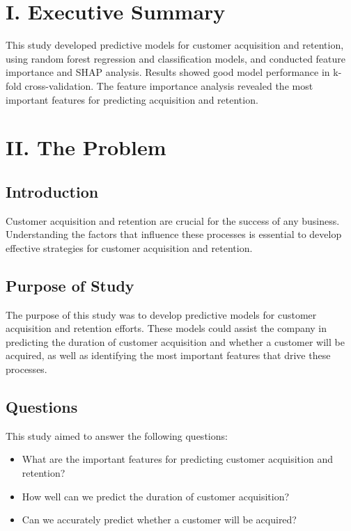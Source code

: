 \hypertarget{i-executive-summary}{%
\section{I. Executive Summary}\label{i-executive-summary}}

This study developed predictive models for customer acquisition and
retention, using random forest regression and classification models, and
conducted feature importance and SHAP analysis. Results showed good
model performance in k-fold cross-validation. The feature importance
analysis revealed the most important features for predicting acquisition
and retention.

\hypertarget{ii-the-problem}{%
\section{II. The Problem}\label{ii-the-problem}}

\hypertarget{introduction}{%
\subsection{Introduction}\label{introduction}}

Customer acquisition and retention are crucial for the success of any
business. Understanding the factors that influence these processes is
essential to develop effective strategies for customer acquisition and
retention.

\hypertarget{purpose-of-study}{%
\subsection{Purpose of Study}\label{purpose-of-study}}

The purpose of this study was to develop predictive models for customer
acquisition and retention efforts. These models could assist the company
in predicting the duration of customer acquisition and whether a
customer will be acquired, as well as identifying the most important
features that drive these processes.

\hypertarget{questions}{%
\subsection{Questions}\label{questions}}

This study aimed to answer the following questions:

\begin{itemize}
\tightlist
\item
  What are the important features for predicting customer acquisition
  and retention?
\item
  How well can we predict the duration of customer acquisition?
\item
  Can we accurately predict whether a customer will be acquired?
\end{itemize}

